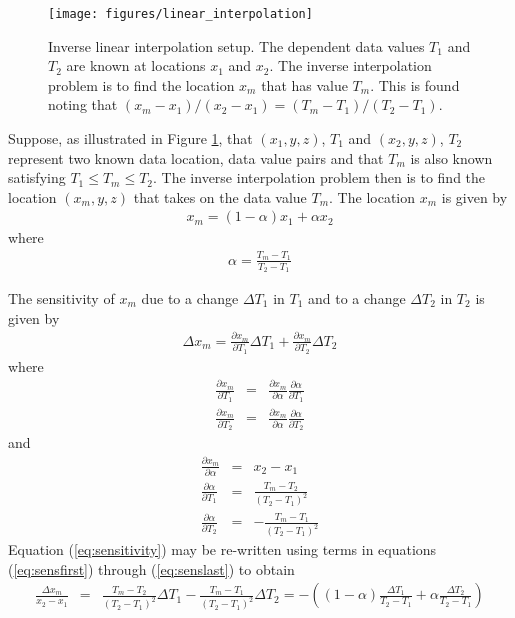 \documentclass[11pt,twoside]{book}
\newcommand{\pxtone}{ \frac{\partial x_m}{\partial T_1} }
\newcommand{\pxttwo}{ \frac{\partial x_m}{\partial T_2} }
\newcommand{\pxalpha}{ \frac{\partial x_m}{\partial \alpha} }
\newcommand{\palphatone}{ \frac{\partial \alpha}{\partial T_1} }
\newcommand{\palphattwo}{ \frac{\partial \alpha}{\partial T_2} }
\newcommand{\figoptions}{hbp}
\begin{document}
\begin{figure}[\figoptions]
\begin{center}
\texttt{[image: figures/linear\_interpolation]}
\end{center}
 \caption[Inverse linear interpolation setup.]{Inverse linear interpolation setup.
 The dependent data values $T_1$ and $T_2$ are known at locations $x_1$ and $x_2$.
 The inverse interpolation problem is to find the location $x_m$ that has value $T_m$.
 This is found noting that $(x_m-x_1)/(x_2-x_1)=(T_m-T_1)/(T_2-T_1)$.
  }
\label{figisointerp}%
\end{figure}

Suppose, as illustrated in Figure \ref{figisointerp}, that $(x_1,y,z)$, $T_1$ and $(x_2,y,z)$, $T_2$ represent two known data location, data value pairs and that $T_m$ is also known satisfying $T_1\le T_m \le T_2$.  The inverse interpolation problem then is to find the location $(x_m,y,z)$ that takes on the data value $T_m$.  The location $x_m$ is given by
\begin{eqnarray*}
x_m=(1-\alpha)x_1+\alpha x_2
\end{eqnarray*}
where
\begin{eqnarray*}
\alpha=\frac{T_m-T_1}{T_2-T_1}
\end{eqnarray*}

\noindent The sensitivity of $x_m$ due to a change $\Delta T_1$ in $T_1$ and to a change $\Delta T_2$ in $T_2$ is given by
\begin{eqnarray}
\Delta x_m= \pxtone \Delta T_1 + \pxttwo \Delta T_2
\label{eq:sensitivity}
\end{eqnarray}
where
\begin{eqnarray}
\pxtone&=&\pxalpha\palphatone \label{eq:sensfirst}\\
\pxttwo&=&\pxalpha\palphattwo
\end{eqnarray}
and
\begin{eqnarray}
\pxalpha&=&x_2-x_1\\
\palphatone&=&\frac{T_m-T_2}{(T_2-T_1)^2}\\
\palphattwo&=&-\frac{T_m-T_1}{(T_2-T_1)^2}
\label{eq:senslast}
\end{eqnarray}
Equation (\ref{eq:sensitivity}) may be re-written using terms in equations (\ref{eq:sensfirst}) through (\ref{eq:senslast}) to obtain
\begin{eqnarray}
\frac{\Delta x_m}{x_2-x_1}&=&\frac{T_m-T_2}{(T_2-T_1)^2}\Delta T_1-
\frac{T_m-T_1}{(T_2-T_1)^2}\Delta T_2
=-\left(
(1-\alpha)\frac{\Delta T_1}{T_2-T_1}+
\alpha\frac{\Delta T_2}{T_2-T_1}\right)
\label{eq:sensfinal}
\end{eqnarray}
\end{document}

